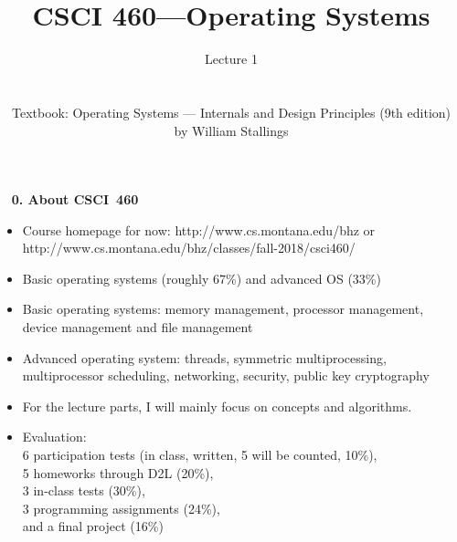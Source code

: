 \pagestyle{empty}
\title{CSCI 460---Operating Systems}
\author{ Lecture 1 \\
\\
\\
Textbook: Operating Systems --- Internals and Design Principles (9th edition)\\
by William Stallings}
\date{}

\newenvironment{slide}[1]{\clearpage
                         ~ \hfill {\bf #1}  \hfill ~\\ \begin{itemize}
                         }{\end{itemize}}
\Large
\maketitle

\begin{slide}{ 0. About CSCI~460}
\item Course homepage for now: http://www.cs.montana.edu/bhz or
\\ http://www.cs.montana.edu/bhz/classes/fall-2018/csci460/
\item Basic operating systems (roughly 67\%) and advanced OS (33\%)
\item Basic operating systems: memory management, processor management, device management and file management
\item Advanced operating system: threads, symmetric multiprocessing, multiprocessor scheduling, networking, security, public key cryptography
\item For the lecture parts, I will mainly focus on concepts and algorithms. 
\item Evaluation:\\
6 participation tests (in class, written, 5 will be counted, 10\%),\\
5 homeworks through D2L (20\%),\\
3 in-class tests (30\%),\\
3 programming assignments (24\%),\\
and  a final project (16\%) \\
\end{slide}

